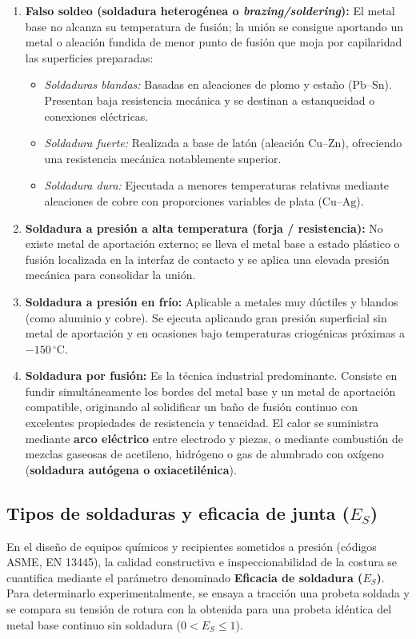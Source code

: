 \begin{enumerate}[label=\alph*)]
    \item \textbf{Falso soldeo (soldadura heterogénea o \textit{brazing/soldering}):} El metal base no alcanza su temperatura de fusión; la unión se consigue aportando un metal o aleación fundida de menor punto de fusión que moja por capilaridad las superficies preparadas:
          \begin{itemize}
              \item \textit{Soldaduras blandas:} Basadas en aleaciones de plomo y estaño ($\text{Pb--Sn}$). Presentan baja resistencia mecánica y se destinan a estanqueidad o conexiones eléctricas.
              \item \textit{Soldadura fuerte:} Realizada a base de latón (aleación $\text{Cu--Zn}$), ofreciendo una resistencia mecánica notablemente superior.
              \item \textit{Soldadura dura:} Ejecutada a menores temperaturas relativas mediante aleaciones de cobre con proporciones variables de plata ($\text{Cu--Ag}$).
          \end{itemize}
    \item \textbf{Soldadura a presión a alta temperatura (forja / resistencia):} No existe metal de aportación externo; se lleva el metal base a estado plástico o fusión localizada en la interfaz de contacto y se aplica una elevada presión mecánica para consolidar la unión.
    \item \textbf{Soldadura a presión en frío:} Aplicable a metales muy dúctiles y blandos (como aluminio y cobre). Se ejecuta aplicando gran presión superficial sin metal de aportación y en ocasiones bajo temperaturas criogénicas próximas a $-150\,^\circ\text{C}$.
    \item \textbf{Soldadura por fusión:} Es la técnica industrial predominante. Consiste en fundir simultáneamente los bordes del metal base y un metal de aportación compatible, originando al solidificar un baño de fusión continuo con excelentes propiedades de resistencia y tenacidad. El calor se suministra mediante \textbf{arco eléctrico} entre electrodo y piezas, o mediante combustión de mezclas gaseosas de acetileno, hidrógeno o gas de alumbrado con oxígeno (\textbf{soldadura autógena o oxiacetilénica}).
\end{enumerate}

\subsection{Tipos de soldaduras y eficacia de junta ($E_S$)}
En el diseño de equipos químicos y recipientes sometidos a presión (códigos ASME, EN 13445), la calidad constructiva e inspeccionabilidad de la costura se cuantifica mediante el parámetro denominado \textbf{Eficacia de soldadura ($E_S$)}. Para determinarlo experimentalmente, se ensaya a tracción una probeta soldada y se compara su tensión de rotura con la obtenida para una probeta idéntica del metal base continuo sin soldadura ($0 < E_S \le 1$).

